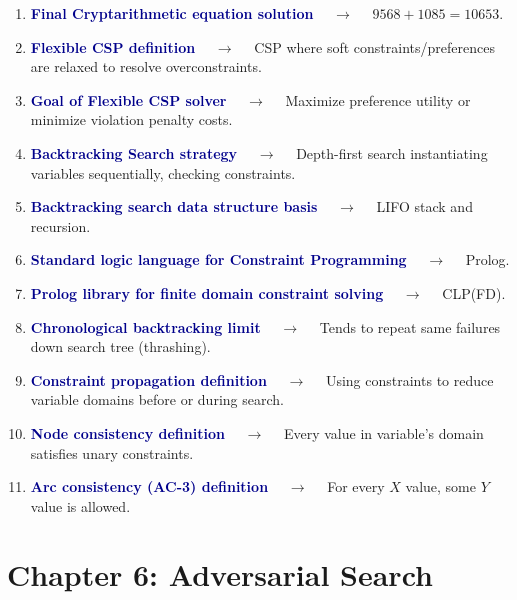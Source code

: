 \documentclass[11pt,a4paper]{article}
\begin{document}
\begin{enumerate}[label=\arabic*., leftmargin=*, labelsep=0.8em, itemsep=0.35em, parsep=0.1em, topsep=0.2em]
  \item \textcolor{darkblue}{\textbf{Final Cryptarithmetic equation solution}} $\quad\to\quad$ $9568 + 1085 = 10653$.
  \item \textcolor{darkblue}{\textbf{Flexible CSP definition}} $\quad\to\quad$ CSP where soft constraints/preferences are relaxed to resolve overconstraints.
  \item \textcolor{darkblue}{\textbf{Goal of Flexible CSP solver}} $\quad\to\quad$ Maximize preference utility or minimize violation penalty costs.
  \item \textcolor{darkblue}{\textbf{Backtracking Search strategy}} $\quad\to\quad$ Depth-first search instantiating variables sequentially, checking constraints.
  \item \textcolor{darkblue}{\textbf{Backtracking search data structure basis}} $\quad\to\quad$ LIFO stack and recursion.
  \item \textcolor{darkblue}{\textbf{Standard logic language for Constraint Programming}} $\quad\to\quad$ Prolog.
  \item \textcolor{darkblue}{\textbf{Prolog library for finite domain constraint solving}} $\quad\to\quad$ CLP(FD).
  \item \textcolor{darkblue}{\textbf{Chronological backtracking limit}} $\quad\to\quad$ Tends to repeat same failures down search tree (thrashing).
  \item \textcolor{darkblue}{\textbf{Constraint propagation definition}} $\quad\to\quad$ Using constraints to reduce variable domains before or during search.
  \item \textcolor{darkblue}{\textbf{Node consistency definition}} $\quad\to\quad$ Every value in variable's domain satisfies unary constraints.
  \item \textcolor{darkblue}{\textbf{Arc consistency (AC-3) definition}} $\quad\to\quad$ For every $X$ value, some $Y$ value is allowed.
\end{enumerate}

\section*{Chapter 6: Adversarial Search}
\end{document}
